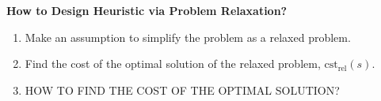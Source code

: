 \begin{process} \textbf{How to Design Heuristic via Problem Relaxation?}
    \begin{enumerate}
        \item Make an assumption to simplify the problem as a relaxed problem. 
        \item Find the cost of the optimal solution of the relaxed problem, $\text{cst}_{\text{rel}}(s)$.
        \item HOW TO FIND THE COST OF THE OPTIMAL SOLUTION?
    \end{enumerate}
\end{process}

\begin{example}
\end{example}







